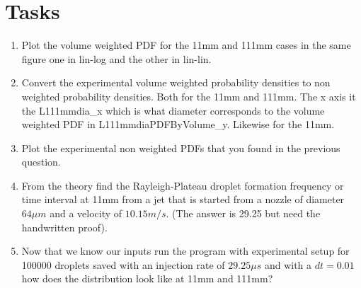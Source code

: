 \documentclass[
    a4paper, 
    12pt, 
    twoside,
]{article} %
\begin{document}
\section{Tasks}
\begin{enumerate}%
    \item Plot the volume weighted PDF for the 11mm and 111mm cases in the same figure one in lin-log and the other in lin-lin.
    \item Convert the experimental volume weighted probability densities to non weighted probability densities. Both for the 11mm and 111mm. The x axis it the L111mmdia\_x which is what diameter corresponds to the volume weighted PDF in L111mmdiaPDFByVolume\_y. Likewise for the 11mm.  
    \item Plot the experimental non weighted PDFs that you found in the previous question. 
    \item From the theory find the Rayleigh-Plateau droplet formation frequency or time interval at 11mm from a jet that is started from a nozzle of diameter $64\mu m $ and a velocity of $10.15 m/s$. (The answer is 29.25 but need the handwritten proof). 
    \item Now that we know our inputs run the program with experimental setup for 100000 droplets saved with an injection rate of $29.25 \mu s$ and with a $dt = 0.01$ how does the distribution look like at 11mm and 111mm?   
\end{enumerate}

\newpage
\nocite{*}
\printbibliography[title = Bibliography]
\end{document}
